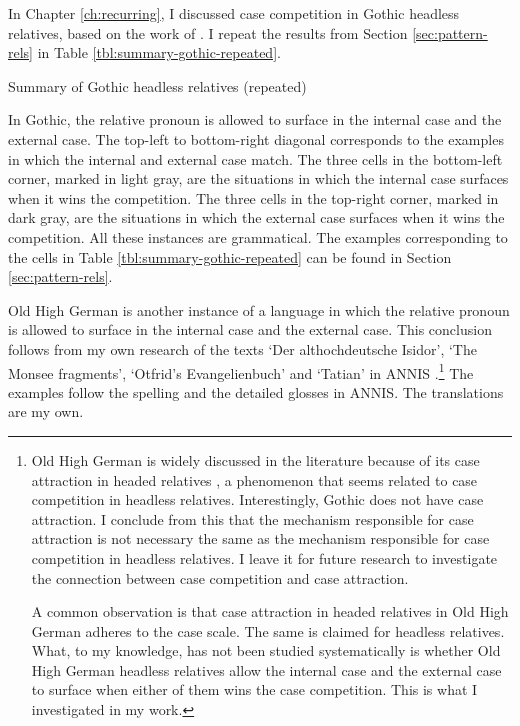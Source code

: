 In Chapter \ref{ch:recurring}, I discussed case competition in Gothic headless relatives, based on the work of \citet{harbert1978}. I repeat the results from Section \ref{sec:pattern-rels} in Table \ref{tbl:summary-gothic-repeated}.

\begin{table}[ht]
  \center
  \caption{Summary of Gothic headless relatives (repeated)}
    
    \label{tbl:summary-gothic-repeated}
\end{table}

In Gothic, the relative pronoun is allowed to surface in the internal case and the external case. The top-left to bottom-right diagonal corresponds to the examples in which the internal and external case match. The three cells in the bottom-left corner, marked in light gray, are the situations in which the internal case surfaces when it wins the competition. The three cells in the top-right corner, marked in dark gray, are the situations in which the external case surfaces when it wins the competition.
 All these instances are grammatical. The examples corresponding to the cells in Table \ref{tbl:summary-gothic-repeated} can be found in Section \ref{sec:pattern-rels}.

Old High German is another instance of a language in which the relative pronoun is allowed to surface in the internal case and the external case. This conclusion follows from my own research of the texts `Der althochdeutsche Isidor', `The Monsee fragments', `Otfrid's Evangelienbuch' and `Tatian' in ANNIS \citep{krause2016}.\footnote{
Old High German is widely discussed in the literature because of its case attraction in headed relatives \citep[cf.][]{pittner1995}, a phenomenon that seems related to case competition in headless relatives. Interestingly, Gothic does not have case attraction. I conclude from this that the mechanism responsible for case attraction is not necessary the same as the mechanism responsible for case competition in headless relatives. I leave it for future research to investigate the connection between case competition and case attraction.

A common observation is that case attraction in headed relatives in Old High German adheres to the case scale.
The same is claimed for headless relatives.
What, to my knowledge, has not been studied systematically is whether Old High German headless relatives allow the internal case and the external case to surface when either of them wins the case competition. This is what I investigated in my work.
}
The examples follow the spelling and the detailed glosses in ANNIS. The translations are my own.

